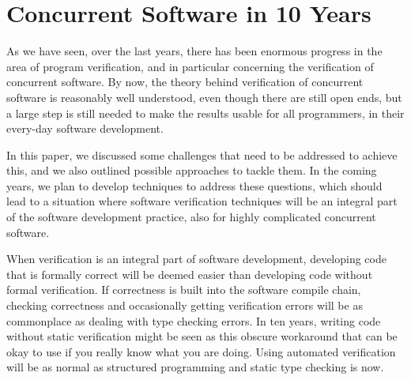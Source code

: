 \section{Concurrent Software in 10 Years}\label{sec:future}

As we have seen, over the last years, there has been enormous
progress in the area of program verification, and in particular
concerning the verification of concurrent software. By now, the theory behind
verification of concurrent software is reasonably well
understood, even though there are still open ends, but a large step
is still needed to make the results usable for all programmers, in
their every-day software
development. 

In this paper, we discussed some challenges that need to be
addressed to achieve this, and we also outlined possible
approaches to tackle them. In the coming years, we plan to develop
techniques to address these questions, which should lead to a situation where
software verification techniques will be an integral part of the software development
practice, also for highly complicated concurrent software.

When verification is an integral part of software development, developing code that is formally correct will be deemed easier than developing code without formal verification.
If correctness is built into the software compile chain, checking correctness and occasionally getting verification errors will be as commonplace as dealing with type checking errors.
In ten years, writing code without static verification might be seen as this obscure workaround that can be okay to use if you really know what you are doing.
Using automated verification will be as normal as structured programming and static type checking is now.

